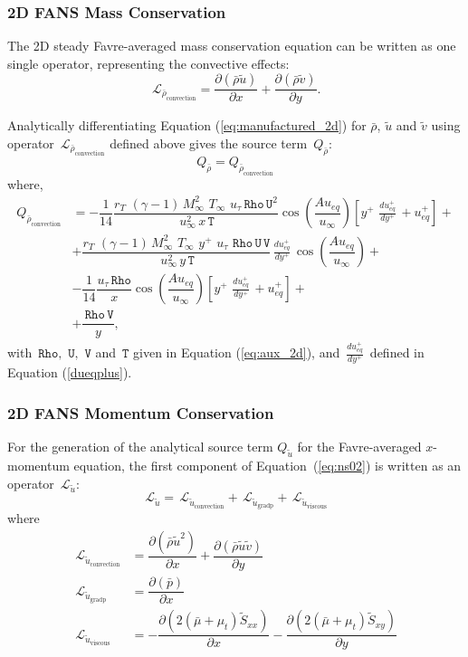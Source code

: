 \documentclass[10pt]{article}
\newcommand{\Diff}[2] {\dfrac{\partial\left( #1\right)}{\partial #2}}
\newcommand{\Rho}{\,\mathtt{Rho}}
\newcommand{\U}{\,\mathtt{U}}
\newcommand{\V}{\,\mathtt{V}}
\newcommand{\T}{\,\mathtt{T}}
\newcommand{\Lo}{\,\mathcal{L}}
\newcommand{\Dueqplusyplus}{\, \frac{du_{eq}^+}{dy^+}\,}
\newcommand{\brho}{\bar{\rho}}
\newcommand{\bp}{\bar{p}}
\newcommand{\tu}{\tilde{u}}
\newcommand{\tv}{\tilde{v}}
\newcommand{\tS}{\tilde{S}}
\newcommand{\bmu}{\bar{\mu}}
\begin{document}
\subsubsection{2D FANS Mass Conservation}

The 2D steady  Favre-averaged mass conservation equation can be written as one single operator, representing the convective effects:
\begin{equation*}
  \Lo_{\brho_{\text{convection}}}=  \Diff{\brho \tu}{x}+\Diff{\brho \tv}{y}.
\end{equation*}

Analytically differentiating Equation (\ref{eq:manufactured_2d}) for $\brho$, $\tu$ and $\tv$ using operator $\Lo_{\brho_{\text{convection}}}$ defined above gives  the source term~$Q_{\brho}$:
$$Q_{\brho}= Q_{\brho_{\text{convection}}}$$
where,
 \begin{equation}
 \begin{split}
Q_{\brho_{\text{convection}}} &= -\dfrac{1}{14}\dfrac{ r_T \, \, (\gamma-1) \,  M_{\infty}^2 \, \, T_{\infty} \,  \, u_{\tau}\Rho \U^2 }{\, u_{\infty}^2 \, x \T}\cos\left(\dfrac{A u_{eq}}{u_{\infty}}\right)\left[y^{+} \, \Dueqplusyplus+u_{eq}^{+}\right] +\\
%
&+\dfrac{r_T \, \, (\gamma-1) \, M_{\infty}^2 \, \, T_{\infty} \,  \,  y^{+} \, \, u_{\tau} \, \Rho \U \V }{\, u_{\infty}^2 \, y \T} \Dueqplusyplus\cos\left(\dfrac{A u_{eq}}{u_{\infty}}\right)+\\
%
&-\dfrac{1}{14} \dfrac{u_{\tau} \Rho }{x}\cos\left(\dfrac{A u_{eq}}{u_{\infty}}\right)\left[y^{+} \, \Dueqplusyplus+u_{eq}^{+}\right] +\\
&+\dfrac{\Rho \V}{y},
 \end{split}
\end{equation}
with $\Rho,\,\U,\,\V$ and $\T$ given in Equation (\ref{eq:aux_2d}), and $\displaystyle\Dueqplusyplus$ defined in Equation (\ref{dueqplus}). 



\subsubsection{2D FANS Momentum Conservation}

For the generation of the analytical source term $Q_{\tu}$ for the Favre-averaged $x$-momentum equation, the first component of Equation~(\ref{eq:ns02}) is written as an  operator $\Lo_{\tu}$:
\begin{equation*}
 \Lo_{\tu}= \Lo_{\tu_\text{convection}} + \Lo_{\tu_\text{gradp}}+\Lo_{\tu_\text{viscous}}
\end{equation*}
where
\begin{equation}
\begin{split}\label{eq:u_operators}
\Lo_{\tu_\text{convection}}&=  \Diff{\brho \tu^2 }{x}+\Diff{\brho \tu\tv}{y} \\
\Lo_{\tu_\text{gradp}}&= \Diff{\bp}{x}\\
\Lo_{\tu_\text{viscous}}&=-\Diff{2(\bmu+\mu_t)\tS_{xx}}{x}-\Diff{2(\bmu+\mu_t)\tS_{xy}}{y}
\end{split}
\end{equation}
\end{document}
